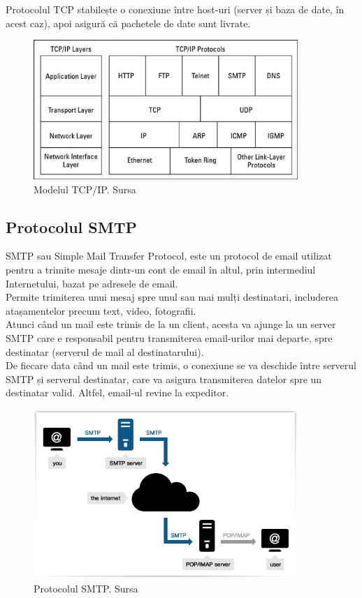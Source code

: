 Protocolul TCP stabilește o conexiune între host-uri (server și baza de date, în acest caz), apoi asigură că pachetele de date sunt livrate.
\begin{figure}[H]
	\centering
	\includegraphics[width=100mm, scale=1]{figs/tcp.jpg}
    \caption{Modelul TCP/IP. Sursa~\cite{TCPDiagram}}
	\label{fig:tcp}
\end{figure}

\subsection{Protocolul SMTP}
SMTP sau Simple Mail Transfer Protocol, este un protocol de email utilizat pentru a trimite mesaje dintr-un cont de email în altul, prin intermediul Internetului, bazat pe adresele de email.\\
Permite trimiterea unui mesaj spre unul sau mai mulți destinatari, includerea atașamentelor precum text, video, fotografii.\\
Atunci când un mail este trimis de la un client, acesta va ajunge la un server SMTP care e responsabil pentru transmiterea email-urilor mai departe, spre destinatar (serverul de mail al destinatarului).\\
De fiecare data când un mail este trimis, o conexiune se va deschide între serverul SMTP și serverul destinatar, care va asigura transmiterea datelor spre un destinatar valid. Altfel, email-ul revine la expeditor.
\begin{figure}[H]
	\centering
	\includegraphics[width=100mm, scale=1]{figs/smtp.png}
    \caption{Protocolul SMTP. Sursa~\cite{SMTP}}
	\label{fig:smtp}
\end{figure}